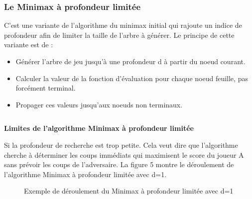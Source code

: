 \documentclass[11pt]{article}
\newcommand{\tmstrong}[1]{\textbf{#1}}
\newcommand{\tmtextit}[1]{{\itshape{#1}}}
\newenvironment{itemizedot}{\begin{itemize} \renewcommand{\labelitemi}{$\bullet$}\renewcommand{\labelitemii}{$\bullet$}\renewcommand{\labelitemiii}{$\bullet$}\renewcommand{\labelitemiv}{$\bullet$}}{\end{itemize}}
\begin{document}
\subsubsection{Le Minimax à profondeur limitée}

C'est une variante de l'algorithme du minimax initial qui rajoute un indice de
profondeur afin de limiter la taille de l'arbre à générer. Le
principe de cette variante est de :

\tmtextit{\begin{itemizedot}
  \item Générer l'arbre de jeu jusqu'à une profondeur d à
  partir du noeud courant.
  
  \item Calculer la valeur de la fonction d'évaluation pour chaque noeud
  feuille, pas forcément terminal.
  
  \item Propager ces valeurs jusqu'aux noeuds non terminaux.
\end{itemizedot}}

{\noindent}{\noindent}\begin{tabular}{l}

\end{tabular}{\hspace*{\fill}}{\smallskip}

{\tmstrong{Limites de l'algorithme Minimax à profondeur limitée}}

Si la profondeur de recherche est trop petite. Cela veut dire que l'algorithme cherche à déterminer les coups immédiats qui maximisent le score
du joueur A sans prévoir les coups de l'adversaire. La figure 5 montre le
déroulement de l'algorithme Minimax à profondeur limitée avec d=1.

\begin{figure}[h]
  \caption {Exemple de déroulement du Minimax à profondeur limitée avec d=1}
  \noindent{}
\end{figure}
\end{document}
